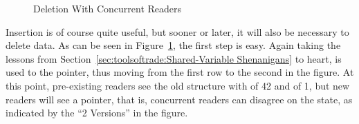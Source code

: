 \begin{figure}[tb]
\centering
{}
\caption{Deletion With Concurrent Readers}
\label{fig:defer:Deletion With Concurrent Readers}
\end{figure}

Insertion is of course quite useful, but sooner or later, it will also
be necessary to delete data.
As can be seen in
Figure~\ref{fig:defer:Deletion With Concurrent Readers},
the first step is easy.
Again taking the lessons from
Section~\ref{sec:toolsoftrade:Shared-Variable Shenanigans}
to heart,  is used to  the pointer,
thus moving from the first row to the second in the figure.
At this point, pre-existing readers see the old structure with
 of 42 and  of 1, but new readers will see
a  pointer, that is, concurrent readers can disagree on
the state, as indicated by the ``2 Versions'' in the figure.


